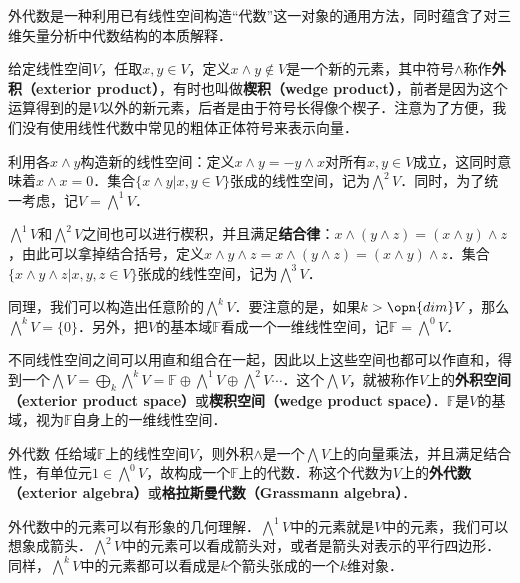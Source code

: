 
外代数是一种利用已有线性空间构造“代数”这一对象的通用方法，同时蕴含了对三维矢量分析中代数结构的本质解释．


给定线性空间$V$，任取$x, y\in V$，定义$x\wedge y\not\in V$是一个新的元素，其中符号$\wedge$称作\textbf{外积（exterior product）}，有时也叫做\textbf{楔积（wedge product）}，前者是因为这个运算得到的是$V$以外的新元素，后者是由于符号长得像个楔子．注意为了方便，我们没有使用线性代数中常见的粗体正体符号来表示向量．

利用各$x\wedge y$构造新的线性空间：定义$x\wedge y=-y\wedge x$对所有$x, y\in V$成立，这同时意味着$x\wedge x=0$．集合$\{x\wedge y|x, y\in V\}$张成的线性空间，记为$\bigwedge^2 V$．同时，为了统一考虑，记$V=\bigwedge^1 V$．

$\bigwedge^1 V$和$\bigwedge^2 V$之间也可以进行楔积，并且满足\textbf{结合律}：$x\wedge(y\wedge z)=(x\wedge y)\wedge z$，由此可以拿掉结合括号，定义$x\wedge y\wedge z=x\wedge(y\wedge z)=(x\wedge y)\wedge z$．集合$\{x\wedge y\wedge z|x, y, z\in V\}$张成的线性空间，记为$\bigwedge^3 V$．

同理，我们可以构造出任意阶的$\bigwedge^k V$．要注意的是，如果$k>\opn{dim} V$，那么$\bigwedge^k V=\{0\}$．另外，把$V$的基本域$\mathbb{F}$看成一个一维线性空间，记$\mathbb{F}=\bigwedge^0 V$．

不同线性空间之间可以用直和组合在一起，因此以上这些空间也都可以作直和，得到一个$\bigwedge V=\bigoplus_k\bigwedge^k V=\mathbb{F}\oplus\bigwedge^1V\oplus\bigwedge^2V\cdots$．这个$\bigwedge V$，就被称作$V$上的\textbf{外积空间（exterior product space）}或\textbf{楔积空间（wedge product space）}．$\mathbb{F}$是$V$的基域，视为$\mathbb{F}$自身上的一维线性空间．

\begin{theorem}{外代数}
任给域$\mathbb{F}$上的线性空间$V$，则外积$\wedge$是一个$\bigwedge V$上的向量乘法，并且满足结合性，有单位元$1\in \bigwedge^0 V$，故构成一个$\mathbb{F}$上的代数．称这个代数为$V$上的\textbf{外代数（exterior algebra）}或\textbf{格拉斯曼代数（Grassmann algebra）}．
\end{theorem}

外代数中的元素可以有形象的几何理解．$\bigwedge^1 V$中的元素就是$V$中的元素，我们可以想象成箭头．$\bigwedge^2 V$中的元素可以看成箭头对，或者是箭头对表示的平行四边形．同样，$\bigwedge^k V$中的元素都可以看成是$k$个箭头张成的一个$k$维对象．

